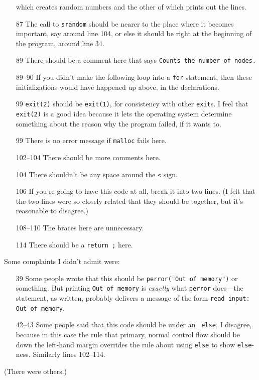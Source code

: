 \begin{itemize}
which creates random numbers and the other of which prints out the lines. 
\item[87] The call to {\tt srandom} should be nearer to the place where
it becomes important, say around line 104, or else it should be right at
the beginning of the program, around line 34.
\item[89] There should be a comment here that says {\tt Counts the
number of nodes.}
\item[89--90] If you didn't make the following loop into a {\tt for}
statement, then these initializations would have happened up above, in
the declarations.  
\item[99] {\tt exit(2)} should be {\tt exit(1)}, for consistency with
other {\tt exit}s.  I feel that {\tt exit(2)} is a good idea because it
lets the operating system determine something about the reason why the
program failed, if it wants to.
\item[99] There is no error message if {\tt malloc} fails here.
\item[102--104] There should be more comments here. 
\item[104] There shouldn't be any space around the {\tt <} sign.
\item[106] If you're going to have this code at all, break it into two
lines.  (I felt that the two lines were so closely related that they
should be together, but it's reasonable to disagree.)
\item[108--110] The braces here are unnecessary.
\item[114] There should be a {\tt return ;} here.
\end{itemize}


Some complaints I didn't admit were:  

\begin{itemize}
\item[39] Some people wrote that this should be {\tt perror("Out of
memory")} or something.  But printing {\tt Out of memory} is {\em
exactly}\/ what {\tt perror} does---the statement, as written, probably
delivers a message of the form {\tt read input: Out of memory}. 
\item[42--43] Some people said that this code should be under an {\tt
else}.  I disagree, because in this case the rule that primary, normal
control flow should be down the left-hand margin overrides the rule
about using {\tt else} to show {\tt else}-ness.  Similarly lines 102--114.
\end{itemize}

\noindent (There were others.)

